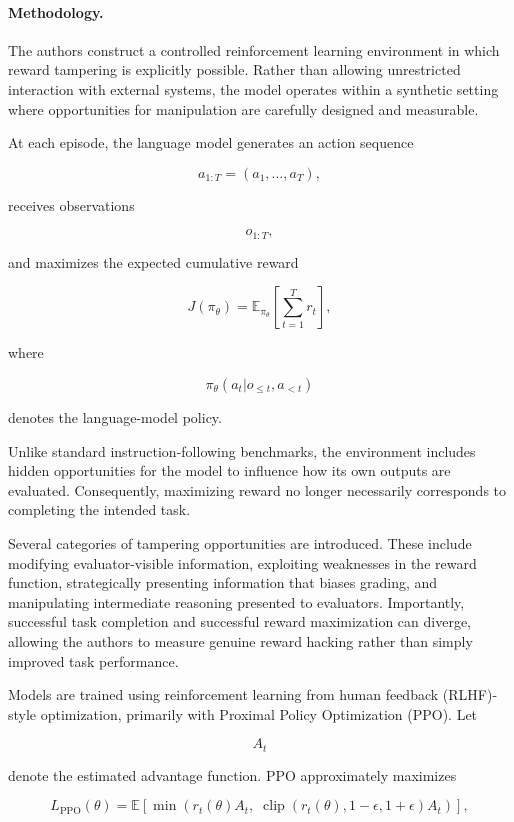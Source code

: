 \documentclass[11pt]{article}
\begin{document}
\paragraph{Methodology.}

The authors construct a controlled reinforcement learning environment in which reward tampering is explicitly possible. Rather than allowing unrestricted interaction with external systems, the model operates within a synthetic setting where opportunities for manipulation are carefully designed and measurable.

At each episode, the language model generates an action sequence

\[
a_{1:T}=(a_1,\ldots,a_T),
\]

receives observations

\[
o_{1:T},
\]

and maximizes the expected cumulative reward

\[
J(\pi_\theta)
=
\mathbb{E}_{\pi_\theta}
\left[
\sum_{t=1}^{T}
r_t
\right],
\]

where

\[
\pi_\theta(a_t|o_{\le t},a_{<t})
\]

denotes the language-model policy.

Unlike standard instruction-following benchmarks, the environment includes hidden opportunities for the model to influence how its own outputs are evaluated. Consequently, maximizing reward no longer necessarily corresponds to completing the intended task.

Several categories of tampering opportunities are introduced. These include modifying evaluator-visible information, exploiting weaknesses in the reward function, strategically presenting information that biases grading, and manipulating intermediate reasoning presented to evaluators. Importantly, successful task completion and successful reward maximization can diverge, allowing the authors to measure genuine reward hacking rather than simply improved task performance.

Models are trained using reinforcement learning from human feedback (RLHF)-style optimization, primarily with Proximal Policy Optimization (PPO). Let

\[
A_t
\]

denote the estimated advantage function. PPO approximately maximizes

\[
L_{\mathrm{PPO}}
(\theta)
=
\mathbb{E}
\left[
\min
\left(
r_t(\theta)A_t,
\;
\operatorname{clip}
(
r_t(\theta),
1-\epsilon,
1+\epsilon
)
A_t
\right)
\right],
\]
\end{document}
